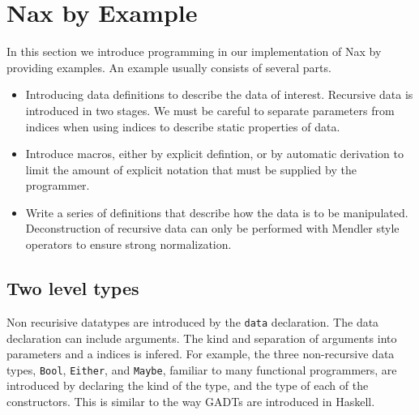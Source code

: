 
\section{Nax by Example}\label{sec:bg}

In this section we introduce programming in our implementation of Nax by providing
examples. An example usually consists of several parts.

\begin{itemize}
\item Introducing data definitions to describe the data of interest. Recursive
data is introduced in two stages. We must be careful to separate parameters
from indices when using indices to describe static properties of data.

\item Introduce macros, either by explicit defintion, or by automatic derivation
to limit the amount of explicit notation that must be supplied by the programmer.

\item Write a series of definitions that describe how the data is to be
manipulated. Deconstruction of recursive data can only be performed with Mendler style operators
to ensure strong normalization.

\end{itemize}

\subsection{Two level types}\label{2level}
Non recurisive datatypes are introduced by the \verb+data+ declaration.
The data declaration can include arguments. The kind and separation of
arguments into parameters and a indices is infered. For example, 
the three non-recursive data types, \verb+Bool+, \verb+Either+, and 
\verb+Maybe+, familiar to many functional programmers, are introduced
by declaring the kind of the type, and the type of each of the
constructors. This is similar to the way {\small GADT}s are introduced in Haskell.

